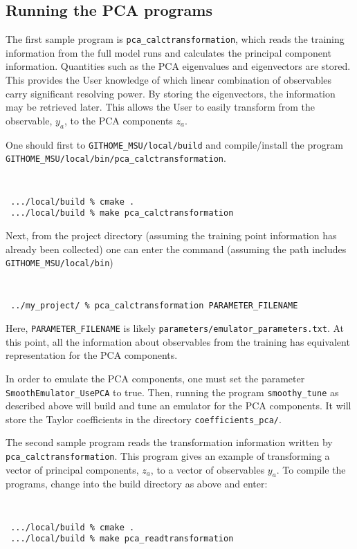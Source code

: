 \documentclass[UserManual.tex]{subfiles}
\begin{document}
\subsection{Running the PCA programs}

The first sample program is {\tt pca\_calctransformation}, which reads the training information from the full model runs and calculates the principal component information. Quantities such as the PCA eigenvalues and eigenvectors are stored. This provides the User knowledge of which linear combination of observables carry significant resolving power. By storing the eigenvectors, the information may be retrieved later. This allows the User to easily transform from the observable, $y_a$, to the PCA components $z_a$. 

One should first to {\tt GITHOME\_MSU/local/build} and compile/install the program\\
{\tt GITHOME\_MSU/local/bin/pca\_calctransformation}.
{\tt
\begin{verbatim}
 .../local/build % cmake .
 .../local/build % make pca_calctransformation
 \end{verbatim}
}
Next, from the project directory (assuming the training point information has already been collected) one can enter the command (assuming the path includes {\tt GITHOME\_MSU/local/bin})
{\tt
\begin{verbatim}
 ../my_project/ % pca_calctransformation PARAMETER_FILENAME
 \end{verbatim}
}
Here, {\tt PARAMETER\_FILENAME} is likely {\tt parameters/emulator\_parameters.txt}. At this point, all the information about observables from the training has equivalent representation for the PCA components.

In order to emulate the PCA components, one must set the parameter {\tt SmoothEmulator\_UsePCA} to true. Then, running the program {\tt smoothy\_tune} as described above will build and tune an emulator for the PCA components. It will store the Taylor coefficients in the directory {\tt coefficients\_pca/}.

The second sample program reads the transformation information written by {\tt pca\_calctransformation}. This program gives an example of transforming a vector of principal components, $z_a$, to a vector of observables $y_a$. To compile the programs, change into the build directory as above and enter:
{\tt
\begin{verbatim}
 .../local/build % cmake .
 .../local/build % make pca_readtransformation
 \end{verbatim}
}
\end{document}
